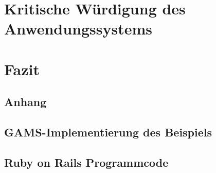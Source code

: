 \documentclass[a4paper,12pt,parskip,bibtotoc,liststotoc]{article}
\begin{document}
     


%



\section{Kritische Würdigung des Anwendungssystems} \label{krit}

\section{Fazit} \label{Fazit}

\newpage

\newpage
%
%
\begin{appendix}
\section{Anhang}

\subsection{GAMS-Implementierung des Beispiels}\label{Imp}

\subsection{Ruby on Rails Programmcode}\label{Anhang2}


\end{appendix}
\end{document}

